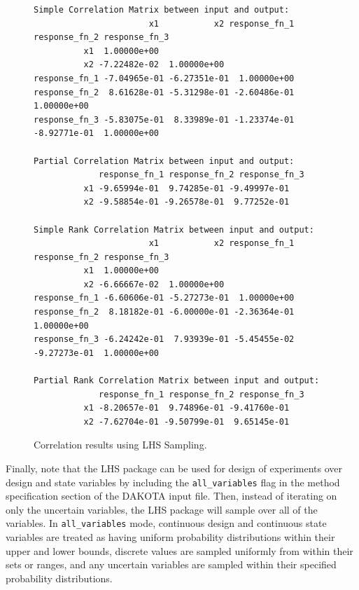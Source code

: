 \begin{figure}
\centering
\begin{bigbox}
\begin{small}
\begin{verbatim}
Simple Correlation Matrix between input and output:
                       x1           x2 response_fn_1 response_fn_2 response_fn_3
          x1  1.00000e+00
          x2 -7.22482e-02  1.00000e+00
response_fn_1 -7.04965e-01 -6.27351e-01  1.00000e+00
response_fn_2  8.61628e-01 -5.31298e-01 -2.60486e-01  1.00000e+00
response_fn_3 -5.83075e-01  8.33989e-01 -1.23374e-01 -8.92771e-01  1.00000e+00

Partial Correlation Matrix between input and output:
             response_fn_1 response_fn_2 response_fn_3
          x1 -9.65994e-01  9.74285e-01 -9.49997e-01
          x2 -9.58854e-01 -9.26578e-01  9.77252e-01

Simple Rank Correlation Matrix between input and output:
                       x1           x2 response_fn_1 response_fn_2 response_fn_3
          x1  1.00000e+00
          x2 -6.66667e-02  1.00000e+00
response_fn_1 -6.60606e-01 -5.27273e-01  1.00000e+00
response_fn_2  8.18182e-01 -6.00000e-01 -2.36364e-01  1.00000e+00
response_fn_3 -6.24242e-01  7.93939e-01 -5.45455e-02 -9.27273e-01  1.00000e+00

Partial Rank Correlation Matrix between input and output:
             response_fn_1 response_fn_2 response_fn_3
          x1 -8.20657e-01  9.74896e-01 -9.41760e-01
          x2 -7.62704e-01 -9.50799e-01  9.65145e-01
\end{verbatim}
\end{small}
\end{bigbox}
\caption{Correlation results using LHS Sampling.}
\label{uq:figure04}
\end{figure}

Finally, note that the LHS package can be used for design of
experiments over design and state variables by including the
\texttt{all\_variables} flag in the method specification section of
the DAKOTA input file. Then, instead of iterating on only the
uncertain variables, the LHS package will sample over all of the
variables.  In \texttt{all\_variables} mode, continuous design and
continuous state variables are treated as having uniform probability
distributions within their upper and lower bounds, discrete values are
sampled uniformly from within their sets or ranges, and any uncertain
variables are sampled within their specified probability distributions.

